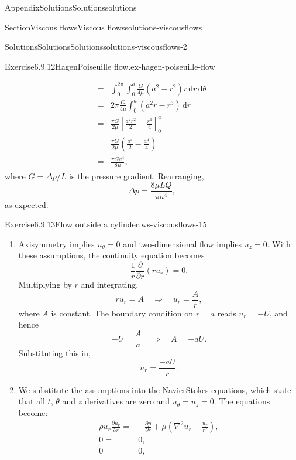 \documentclass[oneside,10pt,]{book}
\numberwithin{equation}{section}
\newcommand{\de}{\mathrm{d}}
\newcommand{\pd}[2]{\frac{\partial#1}{\partial#2}}
\begin{document}
\begin{appendixptx}{Appendix}{Solutions}{}{Solutions}{}{}{solutions}
\begin{sectionptx}{Section}{Viscous flows}{}{Viscous flows}{}{}{solutions-viscousflows}
\begin{solutions-subsection-numberless}{Solutions}{Solutions}{}{Solutions}{}{}{solutions-viscousflows-2}
\begin{divisionsolution}{Exercise}{6.9.12}{Hagen\textendash{}Poiseuille flow.}{ex-hagen-poiseuille-flow}
\begin{enumerate}[font=\bfseries,label=(\alph*),ref=\alph*]
\begin{align*}
=&\int_0^{2\pi}\int_0^a\frac{G}{4\mu}\left(a^2-r^2\right)r\,\de r\,\de \theta\\
=&2\pi\frac{G}{4\mu}\int_0^a\left(a^2r-r^3\right)\,\de r\\
=&\frac{\pi G}{2\mu}\left[\frac{a^2r^2}{2}-\frac{r^4}{4}\right]_0^a\\
=&\frac{\pi G}{2\mu}\left(\frac{a^4}{2}-\frac{a^4}{4}\right)\\
=&\frac{\pi Ga^4}{8\mu},
\end{align*}
where \(G=\Delta p/L\) is the pressure gradient. Rearranging,%
\begin{equation*}
\Delta p=\frac{8\mu LQ}{\pi a^4},
\end{equation*}
as expected.%
\end{enumerate}%
\end{divisionsolution}%
\begin{divisionsolution}{Exercise}{6.9.13}{Flow outside a cylinder.}{ws-viscousflows-15}%
\begin{enumerate}[font=\bfseries,label=(\alph*),ref=\alph*]%
\item[(a)]\noindent\hypertarget{ws-viscousflows-15-3-2-main}{}Axisymmetry implies \(u_\theta=0\) and two-dimensional flow implies \(u_z=0\). With these assumptions, the continuity equation becomes%
\begin{equation*}
\frac1r\pd{}{r}\left(ru_r\right)=0.
\end{equation*}
Multiplying by \(r\) and integrating,%
\begin{equation*}
ru_r=A\quad\Rightarrow\quad u_r=\frac{A}{r},
\end{equation*}
where \(A\) is constant. The boundary condition on \(r=a\) reads \(u_r=-U\), and hence%
\begin{equation*}
-U=\frac{A}{a}\quad\Rightarrow\quad A=-aU.
\end{equation*}
Substituting this in,%
\begin{equation*}
u_r=\frac{-aU}{r}.
\end{equation*}
%
\item[(b)]\noindent\hypertarget{ws-viscousflows-15-4-2-main}{}We substitute the assumptions into the Navier\textendash{}Stokes equations, which state that all \(t\), \(\theta\) and \(z\) derivatives are zero and \(u_\theta=u_z=0\). The equations become:%
\begin{align*}
\rho u_r\pd{u_r}{r}
=&-\pd{p}{r}
+\mu\left(\nabla^2u_r-\frac{u_r}{r^2}\right),\\
0=&0,\\
0=&0,

\end{align*}
\end{enumerate}
\end{divisionsolution}
\end{solutions-subsection-numberless}
\end{sectionptx}
\end{appendixptx}
\end{document}
